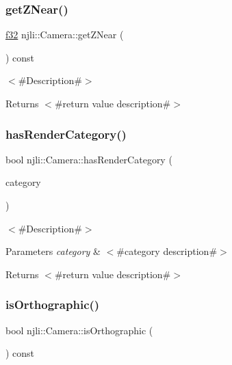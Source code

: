 \subsubsection{\texorpdfstring{get\+Z\+Near()}{getZNear()}}
{\footnotesize\ttfamily \mbox{\hyperlink{_util_8h_a5f6906312a689f27d70e9d086649d3fd}{f32}} njli\+::\+Camera\+::get\+Z\+Near (\begin{DoxyParamCaption}{ }\end{DoxyParamCaption}) const}

$<$\#\+Description\#$>$

\begin{DoxyReturn}{Returns}
$<$\#return value description\#$>$ 
\end{DoxyReturn}
\mbox{\label{classnjli_1_1_camera_a7870e48c1f18f0386a2dc7961a94b02e}} 
\subsubsection{\texorpdfstring{has\+Render\+Category()}{hasRenderCategory()}}
{\footnotesize\ttfamily bool njli\+::\+Camera\+::has\+Render\+Category (\begin{DoxyParamCaption}\item[{const \mbox{\hyperlink{namespacenjli_af7b302a2b48bb644f85c88080925c974}{njli\+Bit\+Categories}}}]{category }\end{DoxyParamCaption})}

$<$\#\+Description\#$>$


\begin{DoxyParams}{Parameters}
{\em category} & $<$\#category description\#$>$\\
\hline
\end{DoxyParams}
\begin{DoxyReturn}{Returns}
$<$\#return value description\#$>$ 
\end{DoxyReturn}
\mbox{\label{classnjli_1_1_camera_a1aefd1a0cb6c7db25ce429bd632d9f71}} 
\subsubsection{\texorpdfstring{is\+Orthographic()}{isOrthographic()}}
{\footnotesize\ttfamily bool njli\+::\+Camera\+::is\+Orthographic (\begin{DoxyParamCaption}{ }\end{DoxyParamCaption}) const}

